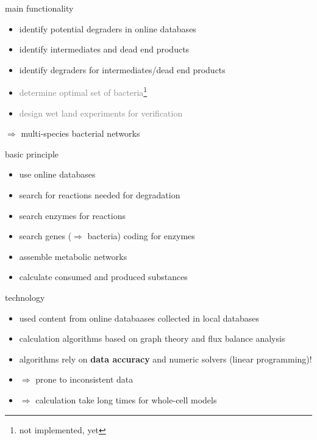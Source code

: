 \documentclass[style=aggie]{powerdot}
\begin{document}
\begin{slide}{main functionality}
\begin{itemize}
 \item identify potential degraders in online databases\newline
 \item identify intermediates and dead end products\newline
 \item identify degraders for intermediates/dead end products\newline
 \item \textcolor{gray}{determine optimal set of bacteria\footnote{not implemented, yet}}\newline
 \item \textcolor{gray}{design wet land experiments for verification\footnotemark[1]}
\end{itemize}
\indent $\Rightarrow$ multi-species bacterial networks
\end{slide}

\begin{slide}{basic principle}
\begin{itemize}
 \item use online databases\newline
 \item search for reactions needed for degradation\newline
 \item search enzymes for reactions\newline
 \item search genes ($\Rightarrow$ bacteria) coding for enzymes\newline
 \item assemble metabolic networks\newline
 \item calculate consumed and produced substances
\end{itemize}
\end{slide}

\begin{slide}{technology}
\begin{itemize}
 \item used content from online databaases collected in local databases\newline
 \item calculation algorithms based on graph theory and flux balance analysis\newline
 \item algorithms rely on \textbf{data accuracy} and numeric solvers (linear programming)!\newline
 \item $\Rightarrow$ prone to inconsistent data\newline
 \item $\Rightarrow$ calculation take long times for whole-cell models
\end{itemize}
\end{slide}
\end{document}
